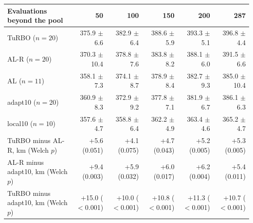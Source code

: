 \begin{tabular}{@{}lrrrrr@{}}
\toprule
Evaluations beyond the pool & 50 & 100 & 150 & 200 & 287 \\
\midrule
TuRBO ($n=20$) & 375.9 $\pm$ 6.6 & 382.9 $\pm$ 6.4 & 388.6 $\pm$ 5.9 & 393.3 $\pm$ 5.1 & 396.8 $\pm$ 4.4 \\
AL-R ($n=20$) & 370.3 $\pm$ 10.4 & 378.8 $\pm$ 7.6 & 383.8 $\pm$ 8.2 & 388.1 $\pm$ 6.0 & 391.5 $\pm$ 6.6 \\
AL ($n=11$) & 358.1 $\pm$ 7.3 & 374.1 $\pm$ 8.7 & 378.9 $\pm$ 8.4 & 382.7 $\pm$ 9.3 & 385.0 $\pm$ 10.4 \\
adapt10 ($n=20$) & 360.9 $\pm$ 8.3 & 372.9 $\pm$ 9.2 & 377.8 $\pm$ 7.1 & 381.9 $\pm$ 6.7 & 386.1 $\pm$ 6.3 \\
local10 ($n=10$) & 357.6 $\pm$ 4.7 & 358.8 $\pm$ 6.4 & 362.2 $\pm$ 4.9 & 363.4 $\pm$ 4.6 & 365.2 $\pm$ 4.7 \\
\midrule
TuRBO minus AL-R, km (Welch $p$) & +5.6 (0.051) & +4.1 (0.075) & +4.7 (0.043) & +5.2 (0.005) & +5.3 (0.005) \\
AL-R minus adapt10, km (Welch $p$) & +9.4 (0.003) & +5.9 (0.032) & +6.0 (0.017) & +6.2 (0.004) & +5.4 (0.011) \\
TuRBO minus adapt10, km (Welch $p$) & +15.0 ($<$0.001) & +10.0 ($<$0.001) & +10.8 ($<$0.001) & +11.3 ($<$0.001) & +10.7 ($<$0.001) \\
\bottomrule
\end{tabular}
